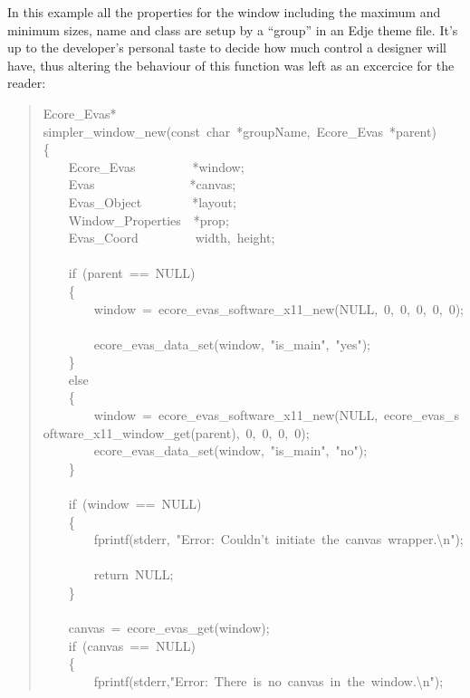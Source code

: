 \documentclass[12pt,a4paper,english]{book}
\begin{document}
In this example all the properties for the window including the maximum and
minimum sizes, name and class are setup by a ``group'' in an Edje theme file.
It's up to the developer's personal taste to decide how much control a designer
will have, thus altering the behaviour of this function was left as an
excercice for the reader:
\begin{quote}{\ttfamily \raggedright \noindent
Ecore{\_}Evas*~\\
simpler{\_}window{\_}new(const~char~*groupName,~Ecore{\_}Evas~*parent)~\\
{\{}~\\
~~~~Ecore{\_}Evas~~~~~~~~~*window;~\\
~~~~Evas~~~~~~~~~~~~~~~*canvas;~\\
~~~~Evas{\_}Object~~~~~~~~*layout;~\\
~~~~Window{\_}Properties~~*prop;~\\
~~~~Evas{\_}Coord~~~~~~~~~width,~height;~\\
~\\
~~~~if~(parent~==~NULL)~\\
~~~~{\{}~\\
~~~~~~~~window~=~ecore{\_}evas{\_}software{\_}x11{\_}new(NULL,~0,~0,~0,~0,~0);~\\
~~~~~~~~ecore{\_}evas{\_}data{\_}set(window,~"is{\_}main",~"yes");~\\
~~~~{\}}~\\
~~~~else~\\
~~~~{\{}~\\
~~~~~~~~window~=~ecore{\_}evas{\_}software{\_}x11{\_}new(NULL,~ecore{\_}evas{\_}software{\_}x11{\_}window{\_}get(parent),~0,~0,~0,~0);~\\
~~~~~~~~ecore{\_}evas{\_}data{\_}set(window,~"is{\_}main",~"no");~\\
~~~~{\}}~\\
~\\
~~~~if~(window~==~NULL)~\\
~~~~{\{}~\\
~~~~~~~~fprintf(stderr,~"Error:~Couldn't~initiate~the~canvas~wrapper.{\textbackslash}n");~\\
~~~~~~~~return~NULL;~\\
~~~~{\}}~\\
~\\
~~~~canvas~=~ecore{\_}evas{\_}get(window);~\\
~~~~if~(canvas~==~NULL)~\\
~~~~{\{}~\\
~~~~~~~~fprintf(stderr,"Error:~There~is~no~canvas~in~the~window.{\textbackslash}n");~\\
}
\end{quote}
\end{document}
